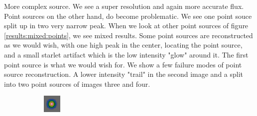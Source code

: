 More complex source. We see a super resolution and again more accurate flux. Point sources on the other hand, do become problematic. We see one point souce split up in two very narrow peak. When we look at other point sources of figure \ref{results:mixed:points}, we see mixed results. Some point sources are reconstructed as we would wish, with one high peak in the center, locating the point source, and a small starlet artifact which is the low intensity "glow" around it. The first point source is what we would wish for. We show a few failure modes of point source reconstruction. A lower intensity "trail" in the second image and a split into two point sources of images three and four.

\begin{figure}[h]
	\centering
	\begin{subfigure}[b]{0.2\linewidth}
		\includegraphics[width=\linewidth]{./chapters/20.results/mixed/problems/point1.png}
	\end{subfigure}
	\begin{subfigure}[b]{0.2\linewidth}

\end{subfigure}
\end{figure}
